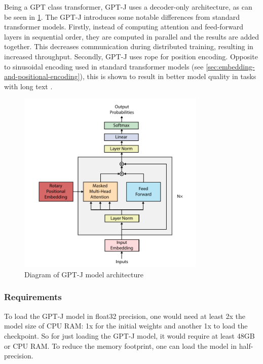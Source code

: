 Being a GPT class transformer, GPT-J uses a decoder-only architecture, as can be seen in \cref{fig:gpt-j-architecture}. The GPT-J introduces some notable differences from standard transformer models. Firstly, instead of computing attention and feed-forward layers in sequential order, they are computed in parallel and the results are added together. This decreases communication during distributed training, resulting in increased throughput. Secondly, GPT-J uses \acrfull{rope} \cite{su2021roformer} for position encoding. Opposite to sinusoidal encoding used in standard transformer models (see \cref{sec:embedding-and-positional-encoding}), this is shown to result in better model quality in tasks with long text \cite{su2021roformer}.

\begin{figure}[htbp]
    \centering
    \includegraphics[width=0.8\textwidth]{figures/gpt-j_architecture.pdf}
    \caption{Diagram of GPT-J model architecture}
    \label{fig:gpt-j-architecture}
\end{figure}

\subsubsection{Requirements}
\label{sec:requirements}
To load the GPT-J model in float32 precision, one would need at least 2x the model size of CPU RAM: 1x for the initial weights and another 1x to load the checkpoint. So for just loading the GPT-J model, it would require at least 48GB or CPU RAM. To reduce the memory footprint, one can load the model in half-precision.

